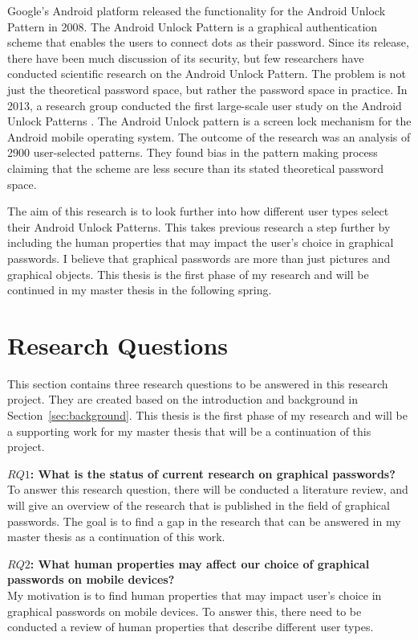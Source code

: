   Google's Android platform released the functionality for the Android Unlock Pattern in 2008. The Android Unlock Pattern is a graphical authentication scheme that enables the users to connect dots as their password. Since its release, there have been much discussion of its security, but few researchers have conducted scientific research on the Android Unlock Pattern. The problem is not just the theoretical password space, but rather the password space in practice. In 2013, a research group conducted the first large-scale user study on the Android Unlock Patterns \cite{Uellenbeck}. The Android Unlock pattern is a screen lock mechanism for the Android mobile operating system. The outcome of the research was an analysis of 2900 user-selected patterns. They found bias in the pattern making process claiming that the scheme are less secure than its stated theoretical password space.

  The aim of this research is to look further into how different user types select their Android Unlock Patterns. This takes previous research a step further by including the human properties that may impact the user's choice in graphical passwords. I believe that graphical passwords are more than just pictures and graphical objects. This thesis is the first phase of my research and will be continued in my master thesis in the following spring.

  \section{Research Questions} \label{sec:researchquestions}
    
  This section contains three research questions to be answered in this research project. They are created based on the introduction and background in Section~\ref{sec:background}. This thesis is the first phase of my research and will be a supporting work for my master thesis that will be a continuation of this project.

  {\bf $RQ1$: What is the status of current research on graphical passwords?} \\
  To answer this research question, there will be conducted a literature review, and will give an overview of the research that is published in the field of graphical passwords. The goal is to find a gap in the research that can be answered in my master thesis as a continuation of this work.

  {\bf $RQ2$: What human properties may affect our choice of graphical passwords on mobile devices?}\\
  My motivation is to find human properties that may impact user's choice in graphical passwords on mobile devices. To answer this, there need to be conducted a review of human properties that describe different user types.

